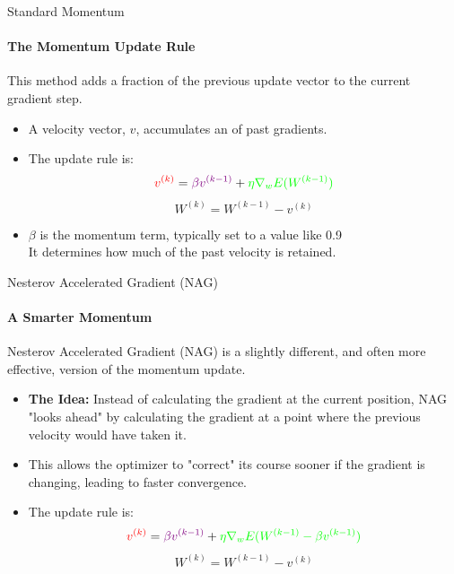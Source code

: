\begin{frame}{Standard Momentum}
    \framesubtitle{The Momentum Update Rule}
    This method adds a fraction of the previous update vector to the current gradient step.
    \begin{itemize}
        \item A velocity vector, $v$, accumulates an  of past gradients.
        \item The update rule is:
            $$ \textcolor{red}{v^{(k)}} = \textcolor{violet}{\beta v^{(k-1)}} + \textcolor{green}{\eta \nabla_w E(W^{(k-1)})} $$
            $$ W^{(k)} = W^{(k-1)} - v^{(k)} $$
        \item $\beta$ is the momentum term, typically set to a value like 0.9 \\ It determines how much of the past velocity is retained.
    \end{itemize}
\end{frame}

\begin{frame}{Nesterov Accelerated Gradient (NAG)}
    \framesubtitle{A Smarter Momentum}
    Nesterov Accelerated Gradient (NAG) is a slightly different, and often more effective, version of the momentum update.
    \begin{itemize}
        \item \textbf{The Idea:} Instead of calculating the gradient at the current position, NAG "looks ahead" by calculating the gradient at a point where the previous velocity would have taken it.
        \item This allows the optimizer to "correct" its course sooner if the gradient is changing, leading to faster convergence.
        \item The update rule is:
             $$ \textcolor{red}{v^{(k)}} = \textcolor{violet}{\beta v^{(k-1)}} + \textcolor{green}{\eta \nabla_w E(W^{(k-1)} - \beta v^{(k-1)})} $$
             $$ W^{(k)} = W^{(k-1)} - v^{(k)} $$
    \end{itemize}
\end{frame}

